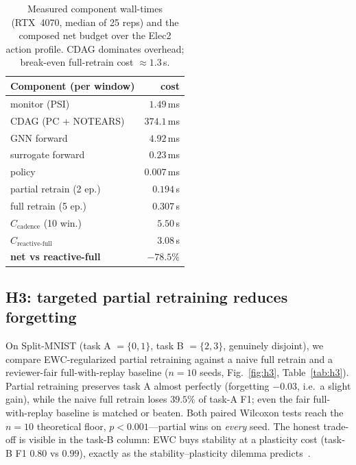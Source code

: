 \documentclass[conference]{IEEEtran}
\begin{document}
\begin{table}[t]
\centering
\caption{Measured component wall-times (RTX~4070, median of 25 reps) and the
composed net budget over the Elec2 action profile. CDAG dominates overhead;
break-even full-retrain cost $\approx1.3$\,s.}
\label{tab:overhead}
\setlength{\tabcolsep}{5pt}
\begin{tabular}{@{}lr@{}}
\toprule
\textbf{Component (per window)} & \textbf{cost}\\
\midrule
monitor (PSI)              & $1.49$\,ms\\
CDAG (PC + NOTEARS)        & $\mathbf{374.1}$\,ms\\
GNN forward               & $4.92$\,ms\\
surrogate forward         & $0.23$\,ms\\
policy                    & $0.007$\,ms\\
\midrule
partial retrain (2 ep.)   & $0.194$\,s\\
full retrain (5 ep.)      & $0.307$\,s\\
\midrule
$C_{\text{cadence}}$ (10 win.) & $5.50$\,s\\
$C_{\text{reactive-full}}$     & $3.08$\,s\\
\textbf{net vs reactive-full} & $\mathbf{-78.5\%}$\\
\bottomrule
\end{tabular}
\end{table}

\subsection{H3: targeted partial retraining reduces forgetting}\label{sec:h3}
On Split-MNIST (task A $=\{0,1\}$, task B $=\{2,3\}$, genuinely disjoint),
we compare EWC-regularized partial retraining against a naive full retrain
and a reviewer-fair full-with-replay baseline ($n{=}10$ seeds,
Fig.~\ref{fig:h3}, Table~\ref{tab:h3}). Partial retraining preserves task
A almost perfectly (forgetting $-0.03$, i.e.\ a slight gain), while the
naive full retrain loses $39.5\%$ of task-A F1; even the fair
full-with-replay baseline is matched or beaten. Both paired Wilcoxon tests
reach the $n{=}10$ theoretical floor, $p<0.001$---partial wins on
\emph{every} seed. The honest trade-off is visible in the task-B column:
EWC buys stability at a plasticity cost (task-B F1 $0.80$ vs $0.99$),
exactly as the stability--plasticity dilemma
predicts~\cite{mccloskey1989catastrophic,french1999catastrophic,delange2021continual}.
\end{document}

